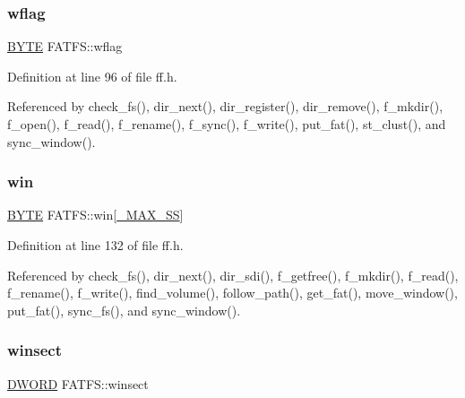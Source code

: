 \mbox{\label{structFATFS_a647e43c9ccae94b7274793d1909897de}} 
\subsubsection{\texorpdfstring{wflag}{wflag}}
{\footnotesize\ttfamily \hyperlink{lz4_8c_a4ae1dab0fb4b072a66584546209e7d58}{B\+Y\+TE} F\+A\+T\+F\+S\+::wflag}



Definition at line 96 of file ff.\+h.



Referenced by check\+\_\+fs(), dir\+\_\+next(), dir\+\_\+register(), dir\+\_\+remove(), f\+\_\+mkdir(), f\+\_\+open(), f\+\_\+read(), f\+\_\+rename(), f\+\_\+sync(), f\+\_\+write(), put\+\_\+fat(), st\+\_\+clust(), and sync\+\_\+window().

\mbox{\label{structFATFS_a7cc35a593465e727ab87723c14610644}} 
\subsubsection{\texorpdfstring{win}{win}}
{\footnotesize\ttfamily \hyperlink{lz4_8c_a4ae1dab0fb4b072a66584546209e7d58}{B\+Y\+TE} F\+A\+T\+F\+S\+::win\mbox{[}\hyperlink{ffconf_8h_ac271b697378912f17132cb9c7d0de024}{\+\_\+\+M\+A\+X\+\_\+\+SS}\mbox{]}}



Definition at line 132 of file ff.\+h.



Referenced by check\+\_\+fs(), dir\+\_\+next(), dir\+\_\+sdi(), f\+\_\+getfree(), f\+\_\+mkdir(), f\+\_\+read(), f\+\_\+rename(), f\+\_\+write(), find\+\_\+volume(), follow\+\_\+path(), get\+\_\+fat(), move\+\_\+window(), put\+\_\+fat(), sync\+\_\+fs(), and sync\+\_\+window().

\mbox{\label{structFATFS_ac60e69c00e6bf7c25febfbac4dc1476b}} 
\subsubsection{\texorpdfstring{winsect}{winsect}}
{\footnotesize\ttfamily \hyperlink{integer_8h_ad342ac907eb044443153a22f964bf0af}{D\+W\+O\+RD} F\+A\+T\+F\+S\+::winsect}



